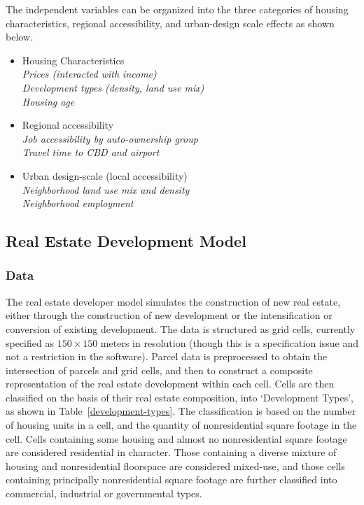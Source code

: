 \documentclass[fleqn]{article}
\begin{document}
The independent variables can be organized into the three
categories of housing characteristics, regional accessibility, and
urban-design scale effects as shown below.

\begin{itemize}

\item{Housing Characteristics} \\
\hspace*{2 mm} \emph{Prices (interacted with income) \\
\hspace*{2 mm} Development types (density, land use mix) \\
\hspace*{2 mm} Housing age}

\item{Regional accessibility} \\
\hspace*{2 mm} \emph{Job accessibility by auto-ownership group \\
\hspace*{2 mm} Travel time to CBD and airport}

\item{Urban design-scale (local accessibility)} \\
\hspace*{2 mm} \emph{Neighborhood land use mix and density \\
\hspace*{2 mm} Neighborhood employment}

\end{itemize}

\subsection{Real Estate Development Model}
\label{real-estate-development-model}

\subsubsection{Data}
The real estate developer model simulates the construction of new
real estate, either through the construction of new development or
the intensification or conversion of existing development.  The
data is structured as grid cells, currently specified as
$150 \times 150$ meters in resolution (though this is a specification issue
and not a restriction in the software). Parcel data is
preprocessed to obtain the intersection of parcels and grid cells,
and then to construct a composite representation of the real
estate development within each cell.  Cells are then classified on
the basis of their real estate composition, into `Development
Types', as shown in Table~\ref{development-types}.  The classification
is based on the number of housing units in a cell, and the quantity of
nonresidential square footage in the cell.  Cells containing some
housing and almost no nonresidential square footage are considered
residential in character.  Those containing a diverse mixture of housing
and nonresidential floorspace are considered mixed-use, and those cells
containing principally nonresidential square footage are further classified
into commercial, industrial or governmental types.
\end{document}
